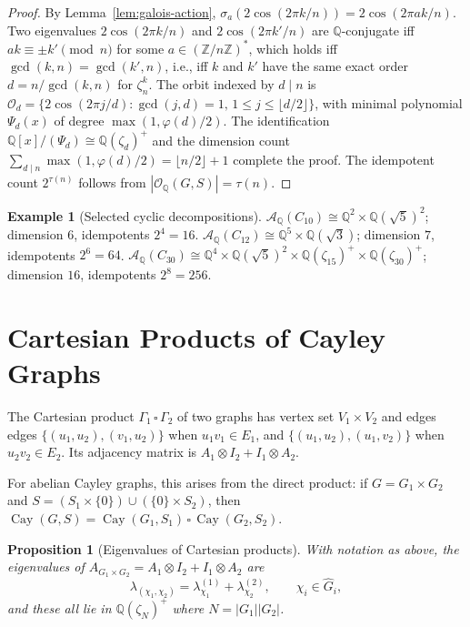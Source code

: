 \documentclass[12pt]{amsart}
\numberwithin{equation}{section}
\theoremstyle{plain}
\newtheorem{proposition}[theorem]{Proposition}
\theoremstyle{definition}
\newtheorem{example}[theorem]{Example}
\DeclareMathOperator{\Cay}{Cay}
\newcommand{\Z}{\mathbb{Z}}
\newcommand{\Q}{\mathbb{Q}}
\newcommand{\calA}{\mathcal{A}}
\newcommand{\calO}{\mathcal{O}}
\newcommand{\Ghat}{\widehat{G}}
\begin{document}
\begin{proof}
By Lemma~\ref{lem:galois-action}, $\sigma_a(2\cos(2\pi k/n)) =
2\cos(2\pi ak/n)$.  Two eigenvalues $2\cos(2\pi k/n)$ and
$2\cos(2\pi k'/n)$ are $\Q$-conjugate iff $ak \equiv \pm k' \pmod{n}$
for some $a \in (\Z/n\Z)^*$, which holds iff $\gcd(k,n) = \gcd(k',n)$,
i.e., iff $k$ and $k'$ have the same exact order $d = n/\gcd(k,n)$ for
$\zeta_n^k$.  The orbit indexed by $d \mid n$ is
$\calO_d = \{2\cos(2\pi j/d) : \gcd(j,d) = 1,\, 1 \le j \le \lfloor d/2\rfloor\}$,
with minimal polynomial $\Psi_d(x)$ of degree $\max(1, \varphi(d)/2)$.
The identification $\Q[x]/(\Psi_d) \cong \Q(\zeta_d)^+$ and the dimension
count $\sum_{d \mid n} \max(1,\varphi(d)/2) = \lfloor n/2\rfloor + 1$
complete the proof.  The idempotent count $2^{\tau(n)}$ follows from
$|\calO_\Q(G,S)| = \tau(n)$.
\end{proof}

\begin{example}[Selected cyclic decompositions]
$\calA_\Q(C_{10}) \cong \Q^2 \times \Q(\sqrt{5})^2$; dimension $6$,
idempotents $2^4 = 16$.
$\calA_\Q(C_{12}) \cong \Q^5 \times \Q(\sqrt{3})$; dimension $7$,
idempotents $2^6 = 64$.
$\calA_\Q(C_{30}) \cong \Q^4 \times \Q(\sqrt{5})^2
\times \Q(\zeta_{15})^+ \times \Q(\zeta_{30})^+$; dimension $16$,
idempotents $2^8 = 256$.
\end{example}

\section{Cartesian Products of Cayley Graphs}
\label{sec:products}

The Cartesian product $\Gamma_1 \,\square\, \Gamma_2$ of two graphs has
vertex set $V_1 \times V_2$ and edges
edges $\{(u_1,u_2),(v_1,u_2)\}$
when $u_1 v_1 \in E_1$, and
$\{(u_1,u_2),(u_1,v_2)\}$ when $u_2 v_2 \in E_2$.
Its adjacency matrix is $A_1 \otimes I_2 + I_1 \otimes A_2$.

For abelian Cayley graphs, this arises from the direct product:
if $G = G_1 \times G_2$ and $S = (S_1 \times \{0\}) \cup (\{0\} \times S_2)$,
then $\Cay(G,S) = \Cay(G_1,S_1) \,\square\, \Cay(G_2,S_2)$.

\begin{proposition}[Eigenvalues of Cartesian products]
\label{prop:cartesian-eig}
With notation as above, the eigenvalues of $A_{G_1 \times G_2}
= A_1 \otimes I_2 + I_1 \otimes A_2$ are
\[
  \lambda_{(\chi_1,\chi_2)} = \lambda_{\chi_1}^{(1)} + \lambda_{\chi_2}^{(2)},
  \qquad \chi_i \in \Ghat_i,
\]
and these all lie in $\Q(\zeta_N)^+$ where $N = |G_1||G_2|$.
\end{proposition}
\end{document}
